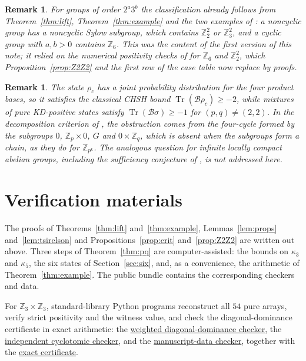 \documentclass[11pt,a4paper]{article}
\theoremstyle{definition}
\theoremstyle{plain}
\newtheorem{remark}[theorem]{Remark}
\DeclareMathOperator{\Tr}{Tr}
\newcommand{\Z}{\mathbb Z}
\newcommand{\B}{\mathcal B}
\begin{document}
\begin{remark}
For groups of order $2^a3^b$ the classification already follows from
Theorem~\ref{thm:lift}, Theorem~\ref{thm:example} and the two examples of
\cite[Section~7]{DLR}: a noncyclic group has a noncyclic Sylow subgroup,
which contains $\Z_2^2$ or $\Z_3^2$, and a cyclic group with $a,b>0$ contains
$\Z_6$. This was the content of the first version of this note; it relied on
the numerical positivity checks of \cite{DLR} for $\Z_6$ and $\Z_2^2$, which
Proposition~\ref{prop:Z2Z2} and the first row of the case table now replace
by proofs.
\end{remark}

\begin{remark}
The state $\rho_c$ has a joint probability distribution for the four product
bases, so it satisfies the classical CHSH bound
$\Tr(\B\rho_c)\geq-2$, while mixtures of pure KD-positive states satisfy
$\Tr(\B\sigma)\geq-1$ for $(p,q)\neq(2,2)$. In the decomposition criterion of
\cite[Theorem~5.2]{DLR}, the obstruction comes from the four-cycle formed by
the subgroups $0$, $\Z_p\times0$, $G$ and $0\times\Z_q$, which is absent when
the subgroups form a chain, as they do for $\Z_{p^k}$. The analogous question
for infinite locally compact abelian groups, including the sufficiency
conjecture of \cite{Spriet}, is not addressed here.
\end{remark}

\section{Verification materials}\label{sec:verif}
The proofs of Theorems~\ref{thm:lift} and~\ref{thm:example},
Lemmas~\ref{lem:props} and~\ref{lem:tsirelson} and
Propositions~\ref{prop:crit} and~\ref{prop:Z2Z2} are written out above. Three
steps of Theorem~\ref{thm:pq} are computer-assisted: the bounds on $\kappa_3$
and $\kappa_5$, the six states of Section~\ref{sec:six}, and, as a
convenience, the arithmetic of Theorem~\ref{thm:example}. The public bundle
contains the corresponding checkers and data.

For $\Z_3\times\Z_3$, standard-library Python programs reconstruct all $54$
pure arrays, verify strict positivity and the witness value, and check the
diagonal-dominance certificate in exact arithmetic: the
\href{https://github.com/jpbruneton/open_quantum_problems/blob/main/research/entries/kd-z3x3/checks/verify_diagonal_certificate.py}{weighted diagonal-dominance checker},
the
\href{https://github.com/jpbruneton/open_quantum_problems/blob/main/research/entries/kd-z3x3/checks/verify_z3_certificate.py}{independent cyclotomic checker},
and the
\href{https://github.com/jpbruneton/open_quantum_problems/blob/main/research/entries/kd-z3x3/checks/verify_paper_data.py}{manuscript-data checker},
together with the
\href{https://github.com/jpbruneton/open_quantum_problems/blob/main/research/entries/kd-z3x3/data/z3x3-simple-certificate.json}{exact certificate}.
\end{document}
